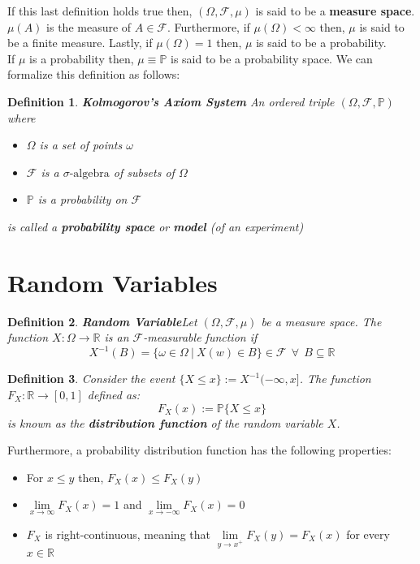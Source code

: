 \documentclass[11pt]{report}
\newtheorem{definition}{Definition}[chapter]
\newcommand{\salg}{\sigma\text{-algebra}}
\begin{document}
If this last definition holds true then, $(\Omega, \mathscr{F}, \mu)$ is said to be a \textbf{measure space}. $\mu(A)$ is the measure of $A\in\mathscr{F}$. Furthermore, if $\mu(\Omega) < \infty$ then, $\mu$ is said to be a finite measure. Lastly, if  $\mu(\Omega) = 1$ then, $\mu$ is said to be a probability.\\

If $\mu$ is a probability then, $\mu \equiv \mathbb{P}$ is said to be a probability space. We can formalize this definition as follows:

\begin{definition}{\textbf{Kolmogorov's Axiom System}}
	An ordered triple $(\Omega, \mathscr{F}, \mathbb{P})$ where
	\begin{itemize}
		\item $\Omega$ is a set of points $\omega$
		\item $\mathscr{F}$ is a $\salg$ of subsets of $\Omega$
		\item $\mathbb P$ is a probability on $\mathscr{F}$
	\end{itemize}
	is called a \textbf{probability space} or \textbf{model} (of an experiment)
\end{definition}

\section{Random Variables}
\begin{definition}{\textbf{Random Variable}}\label{rvar}
	Let $(\Omega, \mathscr{F}, \mu)$ be a measure space. The function $X: \Omega \rightarrow \mathbb{R}$ is an $\mathscr{F}$-measurable function if
	\begin{equation}
		X^{-1}(B) = \{\omega \in \Omega \ | \ X(w) \in B\} \in \mathscr{F} \ \ \forall \ \ B \subseteq \mathbb{R}
	\end{equation}
\end{definition}

\begin{definition}\label{dist_func}
	Consider the event $\{X \leq x\} := X^{-1}(-\infty, x]$. The function $F_X: \mathbb{R} \rightarrow [0, 1]$ defined as:
	\begin{equation}
		F_X(x) := \mathbb{P}\{X \leq x\}
	\end{equation}
	is known as the \textbf{distribution function} of the random variable $X$.
\end{definition}

Furthermore, a probability distribution function has the following properties:
\begin{itemize}
	\item For $x \leq y$ then, $F_X(x) \leq F_X(y)$
	\item $\lim\limits_{x\to\infty} F_X(x) = 1$ and $\lim\limits_{x\to - \infty} F_X(x) = 0$
	\item $F_X$ is right-continuous, meaning that $\lim\limits_{y\to x^+} F_X(y) = F_X(x)$ for every $x \in \mathbb{R}$
\end{itemize}
\end{document}
